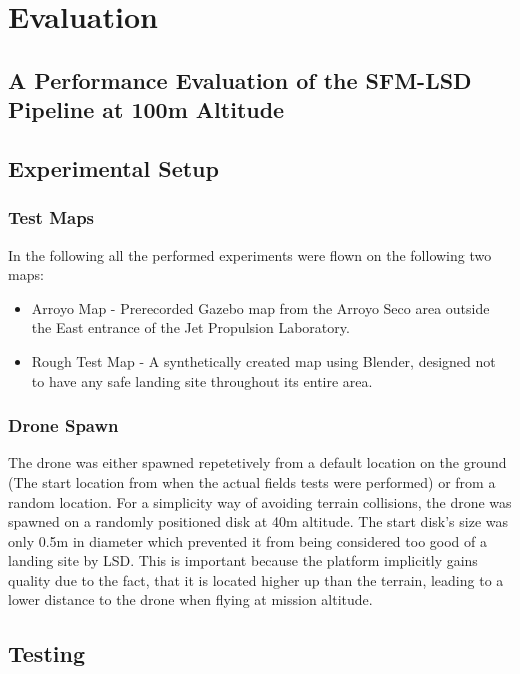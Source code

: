 \chapter{Evaluation}
\label{chapter:evaluation}

\section{A Performance Evaluation of the SFM-LSD Pipeline at 100m Altitude}
\section{Experimental Setup}
\subsection{Test Maps}
In the following all the performed experiments were flown on the following two maps:
\begin{itemize}
    \item Arroyo Map - Prerecorded Gazebo map from the Arroyo Seco area outside the East entrance of the Jet Propulsion Laboratory.
    \item Rough Test Map - A synthetically created map using Blender, designed not to have any safe landing site throughout its entire area. 
\end{itemize}
\subsection{Drone Spawn}
The drone was either spawned repetetively from a default location on the ground (The start location from when the actual fields tests were performed) or from a random location. For a simplicity way of  avoiding terrain collisions, the drone was spawned on a randomly positioned disk at 40m altitude. The start disk's size was only 0.5m in diameter which prevented it from being considered too good of a landing site by LSD. This is important because the platform implicitly gains quality due to the fact, that it is located higher up than the terrain, leading to a lower distance to the drone when flying at mission altitude.


\section{Testing}


